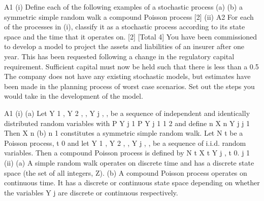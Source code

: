 \documentclass[a4paper,12pt]{article}
\begin{document}
\begin{enumerate}
A1
(i)
Define each of the following examples of a stochastic process
(a)
(b)
a symmetric simple random walk
a compound Poisson process
[2]
(ii)
A2
For each of the processes in (i), classify it as a stochastic process according to its state space and the time that it operates on.
[2]
[Total 4]
You have been commissioned to develop a model to project the assets and liabilities of an insurer after one year. This has been requested following a change in the regulatory capital requirement. Sufficient capital must now be held such that there is
less than a 0.5%
The company does not have any existing stochastic models, but estimates have been made in the planning process of worst case scenarios.
Set out the steps you would take in the development of the model.

A1
(i)
(a)
Let Y 1 , Y 2 , , Y j , , be a sequence of independent and identically
distributed random variables with
P Y j
1
P Y j
1
1
2
and define
n
X n
Y j
j 1
Then X n
(b)
n 1
constitutes a symmetric simple random walk.
Let N t be a Poisson process, t 0 and let Y 1 , Y 2 , , Y j , , be a sequence of i.i.d. random variables. Then a compound Poisson process is defined by
N t
X t
Y j ,
t
0.
j 1
(ii)
(a) A simple random walk operates on discrete time and has a discrete state space (the set of all integers, Z).
(b) A compound Poisson process operates on continuous time.
It has a discrete or continuous state space depending on whether the variables Y j are discrete or continuous respectively.


\end{enumerate}
\end{document}
